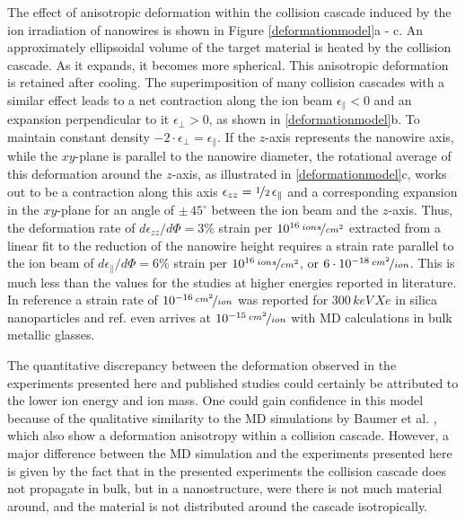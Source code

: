 The effect of anisotropic deformation within the collision cascade induced by the ion irradiation of nanowires is shown in Figure \ref{deformationmodel}a - c. An approximately ellipsoidal volume of the target material is heated by the collision cascade. As it expands, it becomes more spherical. This anisotropic deformation is retained after cooling. The superimposition of many collision cascades with a similar effect leads to a net contraction along the ion beam $\epsilon_{\parallel} < 0$ and an expansion perpendicular to it $\epsilon_{\perp} > 0$, as shown in \ref{deformationmodel}b. To maintain constant density $-2\cdot\epsilon_{\perp} =  \epsilon_{\parallel}$. If the $z$-axis represents the nanowire axis, while the $xy$-plane is parallel to the nanowire diameter, the rotational average of this deformation around the $z$-axis, as illustrated in \ref{deformationmodel}c, works out to be a contraction along this axis $\epsilon_{zz} = \nicefrac{1}{2}\,\epsilon_{\parallel}$ and a corresponding expansion in the $xy$-plane for an angle of $\pm\, 45^\circ$ between the ion beam and the $z$-axis. Thus, the deformation rate of $d\epsilon_{zz}/d\Phi = 3\%$ strain per $10^{16}\,\nicefrac{ions}{cm^2}$ extracted from a linear fit to the reduction of the nanowire height requires a strain rate parallel to the ion beam of $d\epsilon_{\parallel}/d\Phi = 6\%$ strain per $10^{16}\,\nicefrac{ions}{cm^2}$, or $6\cdot 10^{-18}\,\nicefrac{cm^2}{ion}$. This is much less than the values for the studies at higher energies reported in literature. In reference \cite{dillen_ion_2003} a strain rate of $10^{-16}\,\nicefrac{cm^2}{ion}$ was reported for $300\,keV\,Xe$ in silica nanoparticles and ref. \cite{baumer_prediction_2014} even arrives at $10^{-15}\,\nicefrac{cm^2}{ion}$ with MD calculations in bulk metallic glasses. 

The quantitative discrepancy between the deformation observed in the experiments presented here and published studies could certainly be attributed to the lower ion energy and ion mass. One could gain confidence in this model because of the qualitative similarity to the MD simulations by Baumer et al. \cite{baumer_prediction_2014}, which also show a deformation anisotropy within a collision cascade. However, a major difference between the MD simulation and the experiments presented here is given by the fact that in the presented experiments the collision cascade does not propagate in bulk, but in a nanostructure, were there is not much material around, and the material is not distributed around the cascade isotropically. 

